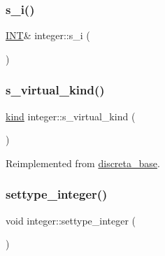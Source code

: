\mbox{\label{classinteger_adf28e9f94d4c844adaa950deeb80b904}} 
\subsubsection{\texorpdfstring{s\+\_\+i()}{s\_i()}}
{\footnotesize\ttfamily \mbox{\hyperlink{galois_8h_a09fddde158a3a20bd2dcadb609de11dc}{I\+NT}}\& integer\+::s\+\_\+i (\begin{DoxyParamCaption}{ }\end{DoxyParamCaption})\hspace{0.3cm}{\ttfamily [inline]}}

\mbox{\label{classinteger_a183985f67ef55beed80bda05a0c574d9}} 
\subsubsection{\texorpdfstring{s\+\_\+virtual\+\_\+kind()}{s\_virtual\_kind()}}
{\footnotesize\ttfamily \mbox{\hyperlink{discreta_8h_aaf25ee7e2306d78c74ec7bc48f092e81}{kind}} integer\+::s\+\_\+virtual\+\_\+kind (\begin{DoxyParamCaption}{ }\end{DoxyParamCaption})\hspace{0.3cm}{\ttfamily [virtual]}}



Reimplemented from \mbox{\hyperlink{classdiscreta__base_a52778a6d6943a468be083d0785d418fb}{discreta\+\_\+base}}.

\mbox{\label{classinteger_a6265c65ef311229acd513d748faba796}} 
\subsubsection{\texorpdfstring{settype\+\_\+integer()}{settype\_integer()}}
{\footnotesize\ttfamily void integer\+::settype\+\_\+integer (\begin{DoxyParamCaption}{ }\end{DoxyParamCaption})}

